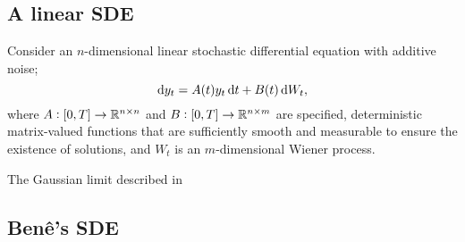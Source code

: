 \subsection{A linear SDE}
Consider an \(n\)-dimensional linear stochastic differential equation with additive noise;
\begin{equation}
	\sde{y_t}{A(t)y_t}{B(t)},
	\label{eqn:linear_n_sde}
\end{equation}
where \(A: [0,T] \to \mathbb{R}^{n\times n}\) and \(B: [0,T] \to \mathbb{R}^{n \times m}\) are specified, deterministic matrix-valued functions that are sufficiently smooth and measurable to ensure the existence of solutions, and \(W_t\) is an \(m\)-dimensional Wiener process.



The Gaussian limit described in 





\subsection{Ben\^e's SDE}





